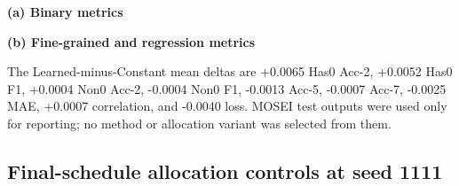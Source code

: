 \begin{table}[t]
\caption{Clean CMU-MOSEI test performance (mean $\pm$ sample standard
deviation over seeds 1111, 1112, and 1113). Bold marks the better value
between the two equal-budget P4 variants.}
\label{tab:mosei-results}
\centering
\small
\textbf{(a) Binary metrics}\par\smallskip
{}

\vspace{0.7em}
\textbf{(b) Fine-grained and regression metrics}\par\smallskip
{}
\end{table}

The Learned-minus-Constant mean deltas are +0.0065 Has0 Acc-2, +0.0052 Has0
F1, +0.0004 Non0 Acc-2, -0.0004 Non0 F1, -0.0013 Acc-5, -0.0007 Acc-7,
-0.0025 MAE, +0.0007 correlation, and -0.0040 loss. MOSEI test outputs were
used only for reporting; no method or allocation variant was selected from
them.

\subsection{Final-schedule allocation controls at seed
1111}\label{final-schedule-allocation-controls}


